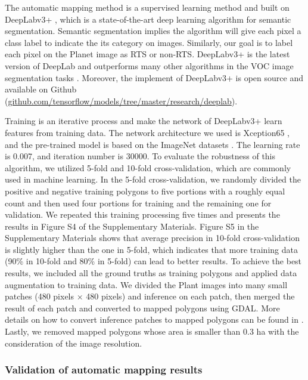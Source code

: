\documentclass[preprint,12pt,authoryear]{elsarticle}
\begin{document}
The automatic mapping method is a supervised learning method and built on DeepLabv3+ \citep{chen_encoder-decoder_2018}, which is a state-of-the-art deep learning algorithm for semantic segmentation. Semantic segmentation implies the algorithm will give each pixel a class label to indicate the its category on images. Similarly, our goal is to label each pixel on the Planet image as RTS or non-RTS. DeepLabv3+ is the latest version of DeepLab and outperforms many other algorithms in the VOC image segmentation tasks \citep{everingham_pascal_2015}. Moreover, the implement of DeepLabv3+ is open source and available on Github (\url{github.com/tensorflow/models/tree/master/research/deeplab}).

Training is an iterative process and make the network of DeepLabv3+ learn features from training data. The network architecture we used is Xception65 \citep{chollet2017xception}, and the pre-trained model is based on the ImageNet datasets \citep{russakovsky2015imagenet}. The learning rate is 0.007, and iteration number is 30000. To evaluate the robustness of this algorithm, we utilized 5-fold and 10-fold cross-validation, which are commonly used in machine learning. In the 5-fold cross-validation, we randomly divided the positive and negative training polygons to five portions with a roughly equal count and then used four portions for training and the remaining one for validation. We repeated this training processing five times and presents the results in Figure S4 of the Supplementary Materials. Figure S5 in the Supplementary Materials shows that average precision in 10-fold cross-validation is slightly higher than the one in 5-fold, which indicates that more training data (90\% in 10-fold and 80\% in 5-fold) can lead to better results. To achieve the best results, we included all the ground truths as training polygons and applied data augmentation to training data. 
We divided the Plant images into many small patches (480 pixels $\times$  480 pixels) and inference on each patch, then merged the result of each patch and converted to mapped polygons using GDAL. More details on how to convert inference patches to mapped polygons can be found in \cite{huang2018automatic}. Lastly, we removed mapped polygons whose area is smaller than 0.3 ha with the consideration of the image resolution.  

\subsubsection{Validation of automatic mapping results}
\label{subsubsec_validation}
\end{document}
